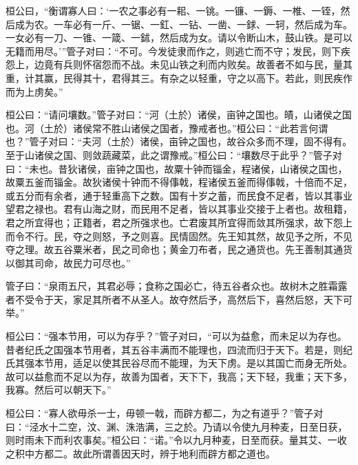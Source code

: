 \documentclass[]{article}
\begin{document}
桓公曰，``衡谓寡人曰：`一农之事必有一耜、一铫。一镰、一鎒、一椎、一铚，然后成为农。一车必有一斤、一锯、一釭、一钻、一凿、一銶、一轲，然后成为车。一女必有一刀、一锥、一箴、一鉥，然后成为女。请以令断山木，鼓山铁。是可以无籍而用尽。'''管子对曰：``不可。今发徒隶而作之，则逃亡而不守；发民，则下疾怨上，边竟有兵则怀宿怨而不战。未见山铁之利而内败矣。故善者不如与民，量其重，计其赢，民得其十，君得其三。有杂之以轻重，守之以高下。若此，则民疾作而为上虏矣。''

桓公曰：``请问壤数。''管子对曰：``河（土於）诸侯，亩钟之国也。皟，山诸侯之国也。河（土於）诸侯常不胜山诸侯之国者，豫戒者也。''桓公曰：``此若言何谓也？''管子对曰：``夫河（土於）诸侯，亩钟之国也，故谷众多而不理，固不得有。至于山诸侯之国、则敛蔬藏菜，此之谓豫戒。''桓公曰：``壤数尽于此乎？''管子对曰：``未也。昔狄诸侯，亩钟之国也，故粟十钟而锱金，程诸侯，山诸侯之国也，故粟五釜而锱金。故狄诸侯十钟而不得倳戟，程诸侯五釜而得倳戟，十倍而不足，或五分而有余者，通于轻重高下之数。国有十岁之蓄，而民食不足者，皆以其事业望君之禄也。君有山海之财，而民用不足者，皆以其事业交接于上者也。故租籍，君之所宜得也；正籍者，君之所强求也。亡君废其所宜得而敛其所强求，故下怨上而令不行。民，夺之则怒，予之则喜。民情固然。先王知其然，故见予之所，不见夺之理。故五谷粟米者，民之司命也；黄金刀布者，民之通货也。先王善制其通货以御其司命，故民力可尽也。''

管子曰：``泉雨五尺，其君必辱；食称之国必亡，待五谷者众也。故树木之胜霜露者不受令于天，家足其所者不从圣人。故夺然后予，高然后下，喜然后怒，天下可举。''

桓公曰：``强本节用，可以为存乎？''管子对曰，``可以为益愈，而未足以为存也。昔者纪氏之国强本节用者，其五谷丰满而不能理也，四流而归于天下。若是，则纪氏其强本节用，适足以使其民谷尽而不能理，为天下虏。是以其国亡而身无所处。故可以益愈而不足以为存，故善为国者，天下下，我高；天下轻，我重；天下多，我寡。然后可以朝天下。''

桓公曰：``寡人欲毋杀一士，毋顿一戟，而辟方都二，为之有道乎？''管子对曰：``泾水十二空，汶、渊、洙浩满，三之於。乃请以令使九月种麦，日至日获，则时雨未下而利农事矣。''桓公曰：``诺。''令以九月种麦，日至而获。量其艾、一收之积中方都二。故此所谓善因天时，辨于地利而辟方都之道也。
\end{document}
